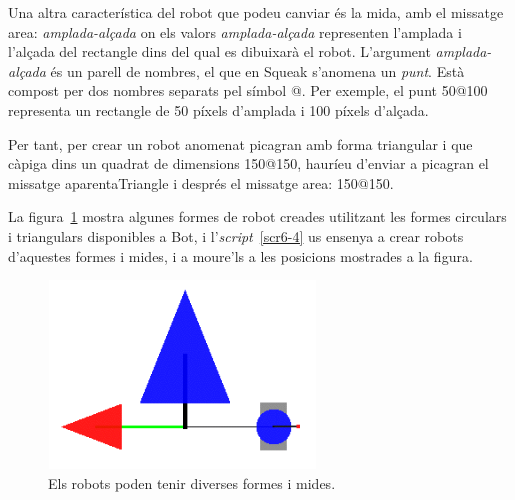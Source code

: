Una altra característica del robot que podeu canviar és la mida, amb el missatge \textsf{area: {\itshape amplada-alçada}} on els valors \emph{amplada-alçada} representen l'amplada i l'alçada del rectangle dins del qual es dibuixarà el robot. L'argument \emph{amplada-alçada} és un parell de nombres, el que en Squeak s'anomena un \emph{punt}. Està compost per dos nombres separats pel símbol \textsf{@}. Per exemple, el punt \textsf{50@100} representa un rectangle de 50 píxels d'amplada i 100 píxels d'alçada. 

Per tant, per crear un robot anomenat \textsf{picagran} amb forma triangular i que càpiga dins un quadrat de dimensions \textsf{150@150}, hauríeu d'enviar a \textsf{picagran} el missatge \textsf{aparentaTriangle} i després el missatge \textsf{area: 150@150}.

La figura~\ref{fig0603} mostra algunes formes de robot creades utilitzant les formes circulars i triangulars disponibles a \textsf{Bot}, i l'\emph{script}~\ref{scr6-4} us ensenya a crear robots d'aquestes formes i mides, i a moure'ls a les posicions mostrades a la figura.

\begin{figure}[h]
\begin{center}
\includegraphics[height=50mm ,width=71mm ]{Imatges/figura6-3.png} 
\end{center}
\caption{Els robots poden tenir diverses formes i mides.}
\label{fig0603}
\end{figure}

